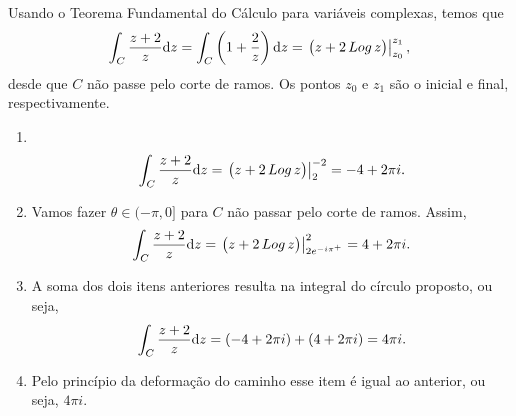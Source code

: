 
\begin{questions}

\begin{solution}
Usando o Teorema Fundamental do Cálculo para variáveis complexas, temos que \vspace{-4mm}
\[
    \int_C \frac{z+2}{z} \mathrm{d} z = \int_C \left(1 + \frac{2}{z}\right) \mathrm{d} z
        = \left.\big(z + 2\mathop{Log} z\big)\right|_{z_0}^{z_1},
\]
desde que $C$ não passe pelo corte de ramos. Os pontos $z_0$ e $z_1$ são o inicial e final, respectivamente.
\begin{enumerate}[label=(\alph*)]
  \item ~\vspace{-5mm}
    \[
        \int_C \frac{z+2}{z} \mathrm{d} z
            = \left.\big(z + 2\mathop{Log} z\big)\right|_{2}^{-2}
            = -4 + 2\pi i.
    \]
    
  \item Vamos fazer $\theta \in (-\pi,0]$ para $C$ não passar pelo corte de ramos. Assim,
    \[
        \int_C \frac{z+2}{z} \mathrm{d} z
            = \left.\big(z + 2\mathop{Log} z\big)\right|_{2 e^{-i\pi^+}}^{2}
            = 4 + 2\pi i.
    \]
    
  \item A soma dos dois itens anteriores resulta na integral do círculo proposto, ou seja,
    \[
        \int_C \frac{z+2}{z} \mathrm{d} z
            = (-4 + 2\pi i) + (4 + 2\pi i)
            = 4 \pi i.
    \]
  
  \item Pelo princípio da deformação do caminho esse item é igual ao anterior, ou seja, $4 \pi i$.
  
\end{enumerate}
\end{solution}


\end{questions}
